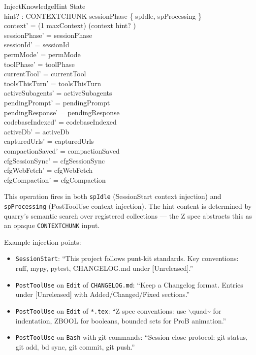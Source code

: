 \documentclass[a4paper,10pt,fleqn]{article}
\begin{document}
\begin{schema}{InjectKnowledgeHint}
  \Delta State \\
  hint? : CONTEXTCHUNK
  \where
  sessionPhase \in \{ spIdle, spProcessing \} \\
  context' = (1 \upto maxContext) \dres (context \cat \langle hint? \rangle) \\
  sessionPhase' = sessionPhase \\
  sessionId' = sessionId \\
  permMode' = permMode \\
  toolPhase' = toolPhase \\
  currentTool' = currentTool \\
  toolsThisTurn' = toolsThisTurn \\
  activeSubagents' = activeSubagents \\
  pendingPrompt' = pendingPrompt \\
  pendingResponse' = pendingResponse \\
  codebaseIndexed' = codebaseIndexed \\
  activeDb' = activeDb \\
  capturedUrls' = capturedUrls \\
  compactionSaved' = compactionSaved \\
  cfgSessionSync' = cfgSessionSync \\
  cfgWebFetch' = cfgWebFetch \\
  cfgCompaction' = cfgCompaction
\end{schema}

This operation fires in both \texttt{spIdle} (SessionStart context
injection) and \texttt{spProcessing} (PostToolUse context injection).
The hint content is determined by quarry's semantic search over
registered collections --- the Z spec abstracts this as an opaque
\texttt{CONTEXTCHUNK} input.

Example injection points:

\begin{itemize}
  \item \texttt{SessionStart}: ``This project follows punt-kit
    standards. Key conventions: ruff, mypy, pytest, CHANGELOG.md
    under [Unreleased].''
  \item \texttt{PostToolUse} on \texttt{Edit} of \texttt{CHANGELOG.md}:
    ``Keep a Changelog format. Entries under [Unreleased] with
    Added/Changed/Fixed sections.''
  \item \texttt{PostToolUse} on \texttt{Edit} of \texttt{*.tex}:
    ``Z spec conventions: use $\backslash$quad\~{} for indentation,
    ZBOOL for booleans, bounded sets for ProB animation.''
  \item \texttt{PostToolUse} on \texttt{Bash} with git commands:
    ``Session close protocol: git status, git add, bd sync,
    git commit, git push.''
\end{itemize}
\end{document}
